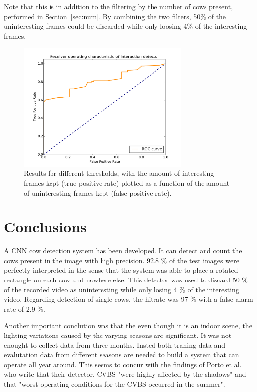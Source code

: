 \documentclass{cta-author}
\begin{document}
Note that this is in addition to the filtering by the number of cows present, performed in Section~\ref{sec:num}. By combining the two filters, 50\% of the uninteresting frames could be discarded while only loosing 4\% of the interesting frames.

\begin{figure}[tb]
\begin{center}
  \includegraphics[width=0.75\textwidth]{roc.pdf}
\end{center}
  \caption{Results for different thresholds, with the amount of interesting frames kept (true positive rate) plotted as a function of the amount of uninteresting frames kept (false positive rate).}
  \label{fig:roc}
\end{figure}


\section{Conclusions}
A CNN cow detection system has been developed. It can detect and count the cows present in the image with high precision. 92.8 \% of the test images were perfectly interpreted in the sense that the system was able to place a rotated rectangle on each cow and nowhere else. This detector was used to discard 50 \% of the recorded video as uninteresting while only losing 4 \% of the interesting video. Regarding detection of single cows, the hitrate was 97 \% with a false alarm rate of 2.9 \%. 

Another important conclution was that the even though it is an indoor scene, the lighting variations caused by the varying seasons are significant. It was not enought to collect data from three months. Insted both traning data and evalutation data from different seasons are needed to build a system that can operate all year around. This seems to concur with the findings of Porto et al. \cite{porto2015automatic} who write that their detector, CVBS 
"were highly affected by the shadows" and that "worst operating
conditions for the CVBS occurred in the summer".
\end{document}
